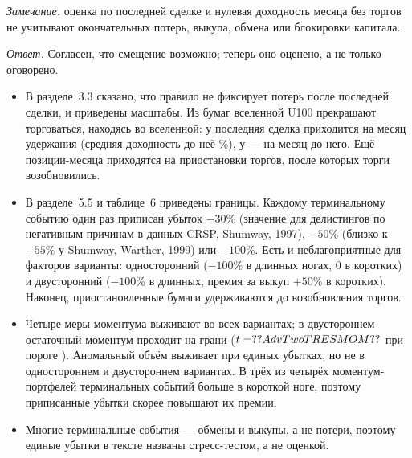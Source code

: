 \documentclass[11pt]{article}
\newcommand{\point}[1]{\par\vspace{10pt}{\large #1}\par\vspace{2pt}}
\newcommand{\remark}[1]{\textit{Замечание.} #1\par}
\newcommand{\answer}{\textit{Ответ.} }
\begin{document}
\point{2. Выбывшие акции}
\remark{оценка по последней сделке и нулевая доходность месяца без торгов не учитывают окончательных потерь,
выкупа, обмена или блокировки капитала.}
\answer Согласен, что смещение возможно; теперь оно оценено, а не только оговорено.
\begin{itemize}
\item В разделе~3.3 сказано, что правило не фиксирует потерь после последней сделки, и приведены масштабы. Из бумаг
вселенной U100  прекращают торговаться, находясь во вселенной: у  последняя
сделка приходится на месяц удержания (средняя доходность до неё \%), у  ---
на месяц до него. Ещё  позиции-месяца приходятся на приостановки торгов, после
которых торги возобновились.
\item В разделе~5.5 и таблице~6 приведены границы. Каждому терминальному событию один раз приписан убыток $-30$\%
(значение для делистингов по негативным причинам в данных CRSP, Shumway, 1997), $-50$\% (близко к $-55$\% у
Shumway, Warther, 1999) или $-100$\%. Есть и неблагоприятные для факторов варианты: односторонний ($-100$\% в
длинных ногах, 0 в коротких) и двусторонний ($-100$\% в длинных, премия за выкуп $+50$\% в коротких). Наконец,
приостановленные бумаги удерживаются до возобновления торгов.
\item Четыре меры моментума выживают во всех вариантах; в двустороннем остаточный моментум проходит на грани
($t=\val{AdvTwoTRESMOM}$ при пороге ). Аномальный объём выживает при единых убытках, но не в
одностороннем и двустороннем вариантах. В трёх из четырёх моментум-портфелей терминальных событий больше в
короткой ноге, поэтому приписанные убытки скорее повышают их премии.
\item Многие терминальные события --- обмены и выкупы, а не потери, поэтому единые убытки в тексте названы
стресс-тестом, а не оценкой.
\end{itemize}
\end{document}

